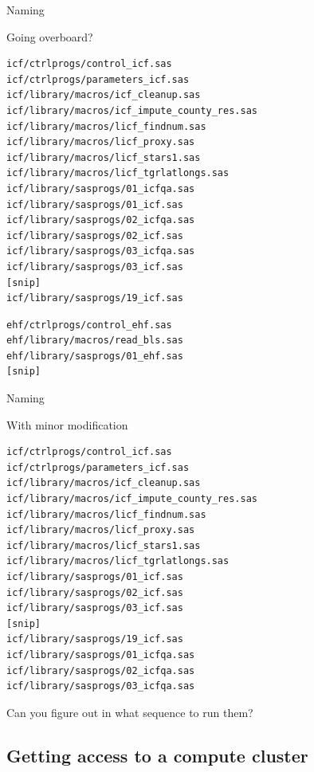 \documentclass[xcolor=table,compress]{beamer}
\begin{document}
\begin{frame}[fragile]{Naming}
\begin{block}{Going overboard?}
\begin{lstlisting}[language=bash,numbers=none,basicstyle=\tiny]
icf/ctrlprogs/control_icf.sas
icf/ctrlprogs/parameters_icf.sas
icf/library/macros/icf_cleanup.sas
icf/library/macros/icf_impute_county_res.sas
icf/library/macros/licf_findnum.sas
icf/library/macros/licf_proxy.sas
icf/library/macros/licf_stars1.sas
icf/library/macros/licf_tgrlatlongs.sas
icf/library/sasprogs/01_icfqa.sas
icf/library/sasprogs/01_icf.sas
icf/library/sasprogs/02_icfqa.sas
icf/library/sasprogs/02_icf.sas
icf/library/sasprogs/03_icfqa.sas
icf/library/sasprogs/03_icf.sas
[snip]
icf/library/sasprogs/19_icf.sas
\end{lstlisting}
\pause
\begin{lstlisting}[language=bash,numbers=none,basicstyle=\tiny]
ehf/ctrlprogs/control_ehf.sas
ehf/library/macros/read_bls.sas
ehf/library/sasprogs/01_ehf.sas
[snip]
\end{lstlisting}
\end{block}
\end{frame}


\begin{frame}[fragile]{Naming}
\begin{block}{With minor modification}
\begin{lstlisting}[language=bash,numbers=none,basicstyle=\tiny]
icf/ctrlprogs/control_icf.sas
icf/ctrlprogs/parameters_icf.sas
icf/library/macros/icf_cleanup.sas
icf/library/macros/icf_impute_county_res.sas
icf/library/macros/licf_findnum.sas
icf/library/macros/licf_proxy.sas
icf/library/macros/licf_stars1.sas
icf/library/macros/licf_tgrlatlongs.sas
icf/library/sasprogs/01_icf.sas
icf/library/sasprogs/02_icf.sas
icf/library/sasprogs/03_icf.sas
[snip]
icf/library/sasprogs/19_icf.sas
icf/library/sasprogs/01_icfqa.sas
icf/library/sasprogs/02_icfqa.sas
icf/library/sasprogs/03_icfqa.sas
\end{lstlisting}
Can you figure out in what sequence to run them?
\end{block}
\end{frame}



\subsection{Getting access to a compute cluster}
\end{document}
